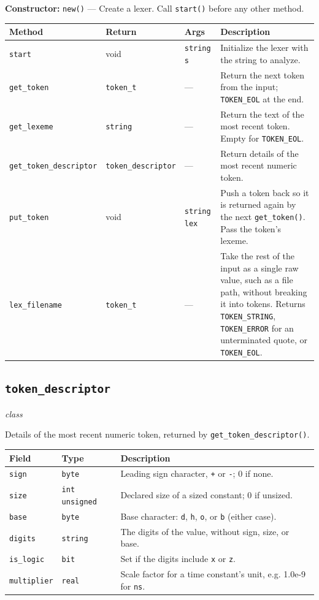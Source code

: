 \documentclass[11pt,letterpaper]{report}
\begin{document}
\noindent\textbf{Constructor:} \texttt{new()} --- Create a lexer. Call \texttt{start()} before any other method.

\begin{xltabular}{\linewidth}{>{\small}p{1.35in} >{\small}p{1.25in} >{\small}p{0.95in} >{\small}X}
\toprule
\textbf{Method} & \textbf{Return} & \textbf{Args} & \textbf{Description} \\
\midrule
\endhead
\bottomrule
\endfoot
\texttt{start} & void & \texttt{string s} & Initialize the lexer with the string to analyze. \\
\texttt{get\_token} & \texttt{token\_t} & --- & Return the next token from the input; \texttt{TOKEN\_EOL} at the end. \\
\texttt{get\_lexeme} & \texttt{string} & --- & Return the text of the most recent token. Empty for \texttt{TOKEN\_EOL}. \\
\texttt{get\_token\_descriptor} & \texttt{token\_descriptor} & --- & Return details of the most recent numeric token. \\
\texttt{put\_token} & void & \texttt{string lex} & Push a token back so it is returned again by the next \texttt{get\_token()}. Pass the token's lexeme. \\
\texttt{lex\_filename} & \texttt{token\_t} & --- & Take the rest of the input as a single raw value, such as a file path, without breaking it into tokens. Returns \texttt{TOKEN\_STRING}, \texttt{TOKEN\_ERROR} for an unterminated quote, or \texttt{TOKEN\_EOL}. \\
\end{xltabular}

\subsection*{\texttt{token\_descriptor}}
\noindent\small\textit{class}\par

Details of the most recent numeric token, returned by \texttt{get\_token\_descriptor()}.

\begin{xltabular}{\linewidth}{>{\small}p{1.5in} >{\small}p{1.5in} >{\small}X}
\toprule
\textbf{Field} & \textbf{Type} & \textbf{Description} \\
\midrule
\endhead
\bottomrule
\endfoot
\texttt{sign} & \texttt{byte} & Leading sign character, \texttt{+} or \texttt{-}; 0 if none. \\
\texttt{size} & \texttt{int unsigned} & Declared size of a sized constant; 0 if unsized. \\
\texttt{base} & \texttt{byte} & Base character: \texttt{d}, \texttt{h}, \texttt{o}, or \texttt{b} (either case). \\
\texttt{digits} & \texttt{string} & The digits of the value, without sign, size, or base. \\
\texttt{is\_logic} & \texttt{bit} & Set if the digits include \texttt{x} or \texttt{z}. \\
\texttt{multiplier} & \texttt{real} & Scale factor for a time constant's unit, e.g. 1.0e-9 for \texttt{ns}. \\
\end{xltabular}
\end{document}
